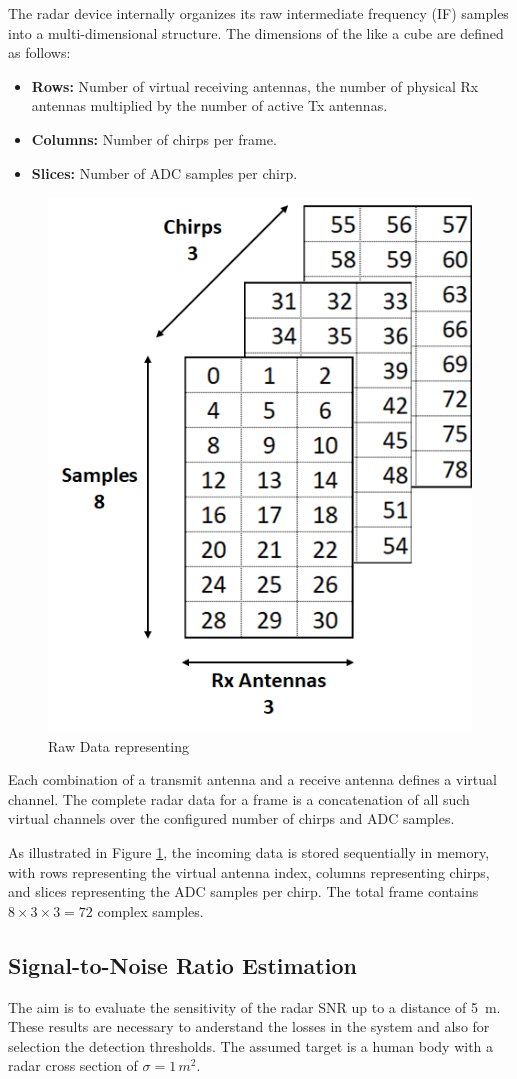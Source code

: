 The radar device internally organizes its raw intermediate frequency (IF) samples into a multi-dimensional structure. The dimensions of the like a cube are defined as follows:
\begin{itemize}
    \item \textbf{Rows:} Number of virtual receiving antennas,  the number of physical Rx antennas multiplied by the number of active Tx antennas.
    \item \textbf{Columns:} Number of chirps per frame.
    \item \textbf{Slices:} Number of ADC samples per chirp.
\end{itemize}
    

\begin{figure}[H]
    \centering
    \includegraphics[width=0.4\linewidth]{Src/images/RowData.png}
    \caption{Raw Data representing}
    \label{fig:RadarFrameCube}
\end{figure}

 Each combination of a transmit antenna and a receive antenna defines a virtual channel. The complete radar data for a frame is a concatenation of all such virtual channels over the configured number of chirps and ADC samples.

As illustrated in Figure \ref{fig:RadarFrameCube}, the incoming data is stored sequentially in memory, with rows representing the virtual antenna index, columns representing chirps, and slices representing the ADC samples per chirp.
The total frame contains $8×3×3=72$ complex samples.



\subsection{Signal-to-Noise Ratio  Estimation}

The aim is to evaluate the sensitivity of the radar SNR up to a distance of \SI{5}{m}. These results are necessary to anderstand the losses in the system and also for  selection the detection thresholds. The assumed target is a human body with a radar cross section of \(\sigma = 1\,\si{m^2}\).

